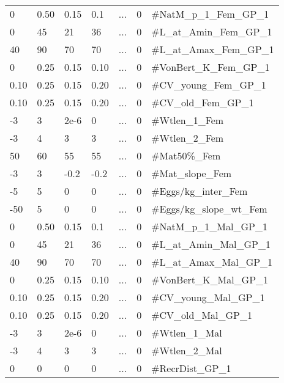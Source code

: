\begin{longtable}{p{1.1cm} p{1.1cm} p{1.1cm} p{1.1cm} p{1.5cm} p{1.1cm} p{6.75cm}}
	0    & 0.50 & 0.15 & 0.1  & \multicolumn{1}{c}{...} & 0 & \#NatM\_p\_1\_Fem\_GP\_1 \Tstrut\\
	0    & 45   & 21   & 36   & \multicolumn{1}{c}{...} & 0 & \#L\_at\_Amin\_Fem\_GP\_1 \\
	40   & 90   & 70   & 70   & \multicolumn{1}{c}{...} & 0 & \#L\_at\_Amax\_Fem\_GP\_1 \\
	0    & 0.25 & 0.15 & 0.10 & \multicolumn{1}{c}{...} & 0 & \#VonBert\_K\_Fem\_GP\_1 \\
	0.10 & 0.25 & 0.15 & 0.20 & \multicolumn{1}{c}{...} & 0 & \#CV\_young\_Fem\_GP\_1 \\
	0.10 & 0.25 & 0.15 & 0.20 & \multicolumn{1}{c}{...} & 0 & \#CV\_old\_Fem\_GP\_1 \\
	-3   & 3    & 2e-6 & 0    & \multicolumn{1}{c}{...} & 0 & \#Wtlen\_1\_Fem \\
	-3   & 4    & 3    & 3    & \multicolumn{1}{c}{...} & 0 & \#Wtlen\_2\_Fem \\
	50   & 60   & 55   & 55   & \multicolumn{1}{c}{...} & 0 & \#Mat50\%\_Fem \\
	-3   & 3    & -0.2 & -0.2 & \multicolumn{1}{c}{...} & 0 & \#Mat\_slope\_Fem \\
	-5   & 5    & 0    & 0    & \multicolumn{1}{c}{...} & 0 & \#Eggs/kg\_inter\_Fem \\
	-50  & 5    & 0    & 0    & \multicolumn{1}{c}{...} & 0 & \#Eggs/kg\_slope\_wt\_Fem \\
	0    & 0.50 & 0.15 & 0.1  & \multicolumn{1}{c}{...} & 0 & \#NatM\_p\_1\_Mal\_GP\_1 \\
	0    & 45   & 21   & 36   & \multicolumn{1}{c}{...} & 0 & \#L\_at\_Amin\_Mal\_GP\_1 \\
	40   & 90   & 70   & 70   & \multicolumn{1}{c}{...} & 0 & \#L\_at\_Amax\_Mal\_GP\_1 \\
	0    & 0.25 & 0.15 & 0.10 & \multicolumn{1}{c}{...} & 0 & \#VonBert\_K\_Mal\_GP\_1 \\
	0.10 & 0.25 & 0.15 & 0.20 & \multicolumn{1}{c}{...} & 0 & \#CV\_young\_Mal\_GP\_1 \\
	0.10 & 0.25 & 0.15 & 0.20 & \multicolumn{1}{c}{...} & 0 & \#CV\_old\_Mal\_GP\_1 \\
	-3   & 3    & 2e-6 & 0    & \multicolumn{1}{c}{...} & 0 & \#Wtlen\_1\_Mal \\
	-3   & 4    & 3    & 3    & \multicolumn{1}{c}{...} & 0 & \#Wtlen\_2\_Mal \\
	 0   & 0    & 0    & 0    & \multicolumn{1}{c}{...} & 0 & \#RecrDist\_GP\_1 \\

\end{longtable}
